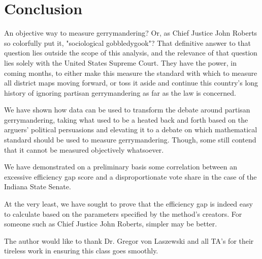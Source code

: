 \documentclass[sigconf]{acmart}
\begin{document}
\section{Conclusion}
An objective way to measure gerrymandering? Or, as Chief Justice John Roberts so colorfully put it, "sociological gobbledygook"? That definitive answer to that question lies outside the scope of this analysis, and the relevance of that question lies solely with the United States Supreme Court. They have the power, in coming months, to either make this measure the standard with which to measure all district maps moving forward, or toss it aside and continue this country's long history of ignoring partisan gerrymandering as far as the law is concerned.

We have shown how data can be used to transform the debate around partisan gerrymandering, taking what used to be a heated back and forth based on the arguers' political persuasions and elevating it to a debate on which mathematical standard should be used to measure gerrymandering. Though, some still contend that it cannot be measured objectively whatsoever.

We have demonstrated on a preliminary basis some correlation between an excessive efficiency gap score and a disproportionate vote share in the case of the Indiana State Senate.

At the very least, we have sought to prove that the efficiency gap is indeed easy to calculate based on the parameters specified by the method's creators. For someone such as Chief Justice John Roberts, simpler may be better.

\begin{acks}

  The author would like to thank Dr. Gregor von Laszewski and all TA's for their tireless work in ensuring this class goes smoothly.

\end{acks}


 

\appendix
\end{document}
